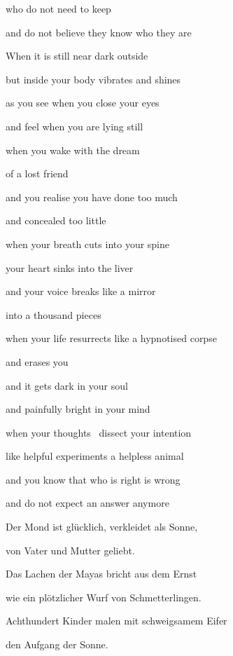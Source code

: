 \documentclass[a4paper]{article}
\begin{document}
who do not need to keep

and do not believe they know who they are


\bigskip

When it is still near dark outside

but inside your body vibrates and shines

as you see when you close your eyes

and feel when you are lying still


\bigskip

when you wake with the dream 

of a lost friend

and you realise you have done too much

and concealed too little


\bigskip

when your breath cuts into your spine

your heart sinks into the liver

and your voice breaks like a mirror

into a thousand pieces


\bigskip

when your life resurrects like a hypnotised corpse

and erases you

and it gets dark in your soul

and painfully bright in your mind


\bigskip

when your thoughts \ dissect your intention

like helpful experiments a helpless animal

and you know that who is right is wrong 

and do not expect an answer anymore



\bigskip

Der Mond ist glücklich, verkleidet als Sonne,

von Vater und Mutter geliebt.


\bigskip

Das Lachen der Mayas bricht aus dem Ernst

wie ein plötzlicher Wurf von Schmetterlingen.


\bigskip

Achthundert Kinder malen mit schweigsamem Eifer

den Aufgang der Sonne.
\end{document}
